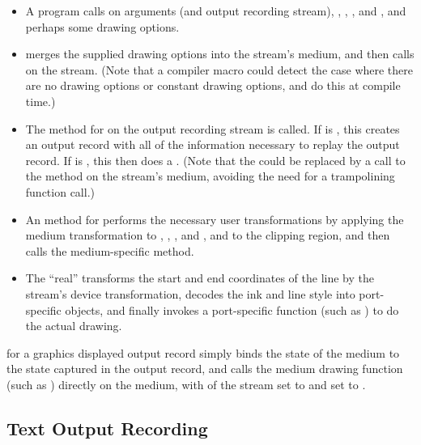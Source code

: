 \begin{itemize}
\item A program calls  on arguments  (and output
recording stream), , , , and , and perhaps some
drawing options.

\item {} merges the supplied drawing options into the stream's
medium, and then calls  on the stream.  (Note that a
compiler macro could detect the case where there are no drawing options or
constant drawing options, and do this at compile time.)

\item The  method for  on the output recording
stream is called.  If  is , this creates an
output record with all of the information necessary to replay the output record.
If  is , this then does a .
(Note that the  could be replaced by a call to the
 method on the stream's medium, avoiding the need for a
trampolining function call.)

\item An  method for  performs the necessary
user transformations by applying the medium transformation to ,
, , and , and to the clipping region, and then calls the
medium-specific method.

\item The ``real''  transforms the start and end
coordinates of the line by the stream's device transformation, decodes the ink
and line style into port-specific objects, and finally invokes a port-specific
function (such as ) to do the actual drawing.
\end{itemize}

 for a graphics displayed output record simply binds
the state of the medium to the state captured in the output record, and calls
the medium drawing function (such as ) directly on the
medium, with  of the stream set to  and
 set to .


\subsection {Text Output Recording}

